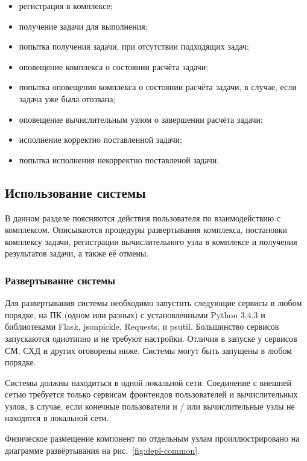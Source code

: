 \documentclass[a4paper,12pt]{report}
\numberwithin{equation}{section}
\begin{document}
  \begin{itemize}
    \item регистрация в комплексе;
    \item получение задачи для выполнения;
    \item попытка получения задачи, при отсутствии подходящих задач;
    \item оповещение комплекса о состоянии расчёта задачи;
    \item попытка оповещения комплекса о состоянии расчёта задачи, в случае, если задача уже была отозвана;
    \item оповещение вычислительным узлом о завершении расчёта задачи;
    \item исполнение корректно поставленной задачи;
    \item попытка исполнения некорректно поставленой задачи.
  \end{itemize}
  
  \subsection{Использование системы}  
  
  В данном разделе поясняются действия пользователя по взаимодействию с комплексом. 
  Описываются процедуры развертывания комплекса, постановки комплексу задачи, регистрации вычислительного узла в комплексе и получения результатов задачи, а также её отмены.
  
  \subsubsection{Развертывание системы}
  Для развертывания системы необходимо запустить следующие сервисы в любом порядке, 
  на ПК (одном или разных) с установленными Python 3.4.3 и библиотеками Flask, jsonpickle, Requests, и psutil. 
  Большинство сервисов запускаются однотипно и не требуют настройки. 
  Отличия в запуске у сервисов СМ, СХД и других оговорены ниже.
  Системы могут быть запущены в любом порядке.
  
  Системы должны находиться в одной локальной сети. 
  Соединение с внешней сетью требуется только сервисам фронтендов пользователей и вычислительных узлов, 
  в случае, если конечные пользователи и / или вычислительные узлы не находятся в локальной сети.
  
  Физическое размещение компонент по отдельным узлам проиллюстрировано на диаграмме развёртывания на рис.~\ref{fig:depl-common}.
  
\end{document}
